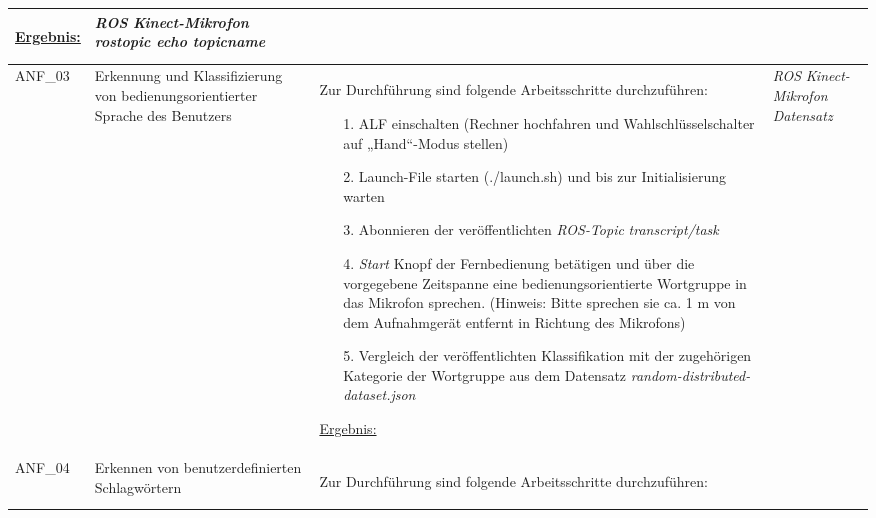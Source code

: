 \documentclass[12pt,a4paper,oneside,numbers=noenddot,captions=tableheading,toc=bibliography,openany,tikz,margin=5mm]{scrbook}
\begin{document}
\begin{longtable}{|p{}|p{}|p{7cm}|p{}|}
\underline{Ergebnis:}\newline
\newline

\textbf{}	%
& \textit{ROS}\newline
\textit{Kinect-Mikrofon}\newline
\textit{rostopic echo topicname}\newline

\\
\hline

ANF\_03 & Erkennung und Klassifizierung von bedienungsorientierter Sprache des Benutzers & Zur Durchführung sind folgende Arbeitsschritte durchzuführen:
\begin{itemize}
	
	\item[1.]	ALF einschalten (Rechner hochfahren und Wahlschlüsselschalter auf „Hand“-Modus stellen)
	\item[2.]	Launch-File starten (./launch.sh) und bis zur Initialisierung warten
	\item[3.]	Abonnieren der veröffentlichten \textit{ROS-Topic} \textit{transcript/task}
	\item[4.]	\textit{Start} Knopf der Fernbedienung betätigen und über die vorgegebene Zeitspanne eine bedienungsorientierte Wortgruppe in das Mikrofon sprechen. (Hinweis: Bitte sprechen sie ca. 1 m von dem Aufnahmgerät entfernt in Richtung des Mikrofons)
	\item[5.]	Vergleich der veröffentlichten Klassifikation mit der zugehörigen Kategorie der Wortgruppe aus dem Datensatz \textit{random-distributed-dataset.json}
	
\end{itemize}

\underline{Ergebnis:}\newline
\newline

\textbf{}	%
& \textit{ROS}\newline
\textit{Kinect-Mikrofon}\newline
\textit{Datensatz}\newline
\\
\hline

ANF\_04 & 	Erkennen von benutzerdefinierten Schlagwörtern & Zur Durchführung sind folgende Arbeitsschritte durchzuführen:
\begin{itemize}
	

\end{itemize}
\end{longtable}
\end{document}
